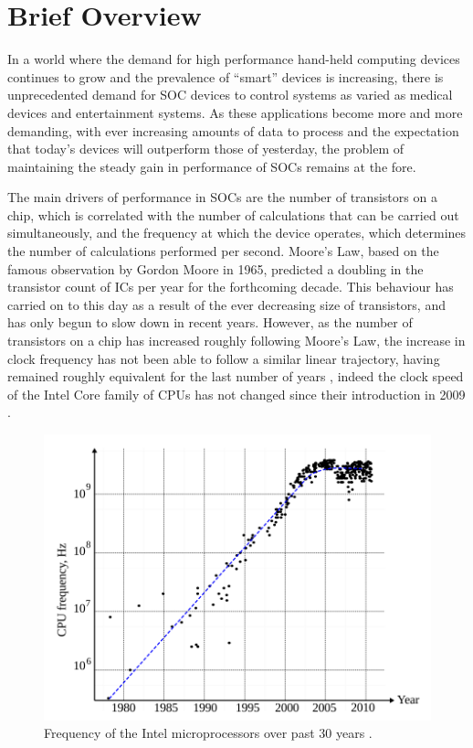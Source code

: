\section{Brief Overview}
In a world where the demand for high performance hand-held computing devices continues to grow and the prevalence of ``smart'' devices is increasing, there is unprecedented demand for \ac{SOC} devices to control systems as varied as medical devices and entertainment systems.
As these applications become more and more demanding, with ever increasing amounts of data to process and the expectation that today's devices will outperform those of yesterday, the problem of maintaining the steady gain in performance of \acp{SOC} remains at the fore.

The main drivers of performance in \acp{SOC} are the number of transistors on a chip, which is correlated with the number of calculations that can be carried out simultaneously, and the frequency at which the device operates, which determines the number of calculations performed per second.
Moore's Law, based on the famous observation by Gordon Moore in 1965\cite{moore1965cramming}, predicted a doubling in the transistor count of \ac{IC}s per year for the forthcoming decade. This behaviour has carried on to this day as a result of the ever decreasing size of transistors, and has only begun to slow down in recent years.
However, as the number of transistors on a chip has increased roughly following Moore's Law, the increase in clock frequency has not been able to follow a similar linear trajectory, having remained roughly equivalent for the last number of years \cite{ross2008cpu}, indeed the clock speed of the Intel Core family of \ac{CPU}s has not changed since their introduction in 2009 \cite{intelark}.
\begin{figure}[h]
	\centering
	\includegraphics[scale=0.4]{../eldar_last_30_yrs}
	\caption{Frequency of the Intel microprocessors over past 30 years \cite{zianbetov2013phd}.}
	\label{fig:eldar_last_30_yrs}
\end{figure}\\

